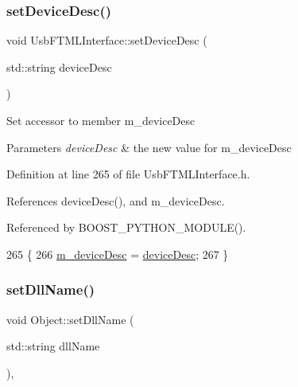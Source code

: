 \subsubsection{\texorpdfstring{set\+Device\+Desc()}{setDeviceDesc()}}
{\footnotesize\ttfamily void Usb\+F\+T\+M\+L\+Interface\+::set\+Device\+Desc (\begin{DoxyParamCaption}\item[{std\+::string}]{device\+Desc }\end{DoxyParamCaption})\hspace{0.3cm}{\ttfamily [inline]}}

Set accessor to member m\+\_\+device\+Desc 
\begin{DoxyParams}{Parameters}
{\em device\+Desc} & the new value for m\+\_\+device\+Desc \\
\hline
\end{DoxyParams}


Definition at line 265 of file Usb\+F\+T\+M\+L\+Interface.\+h.



References device\+Desc(), and m\+\_\+device\+Desc.



Referenced by B\+O\+O\+S\+T\+\_\+\+P\+Y\+T\+H\+O\+N\+\_\+\+M\+O\+D\+U\+L\+E().


\begin{DoxyCode}
265                                             \{
266     \hyperlink{classUsbFTMLInterface_a15063a6d03335ec8988e41eb61a1ab9f}{m\_deviceDesc} = \hyperlink{classUsbFTMLInterface_ab541b4c57c1e7e947037acbfebc3fe3b}{deviceDesc};
267   \}
\end{DoxyCode}
\mbox{\label{classObject_a870c5af919958c2136623b2d7816d123}} 
\subsubsection{\texorpdfstring{set\+Dll\+Name()}{setDllName()}}
{\footnotesize\ttfamily void Object\+::set\+Dll\+Name (\begin{DoxyParamCaption}\item[{std\+::string}]{dll\+Name }\end{DoxyParamCaption})\hspace{0.3cm}{\ttfamily [inline]}, {\ttfamily [inherited]}}

